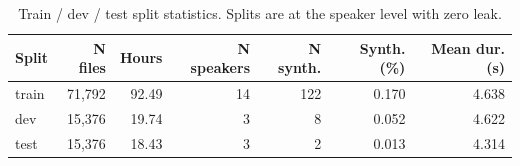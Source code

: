 \begin{table}[!t]
  \centering
  \caption{Train / dev / test split statistics. Splits are at the speaker level with zero leak.}
  \label{tab:per_split}
  \small
  \begin{tabular}{lrrrrrr}
  \toprule
  Split & N files & Hours & N speakers & N synth. & Synth. (\%) & Mean dur. (s) \\
  \midrule
  train & 71,792 & 92.49 & 14 & 122 & 0.170 & 4.638 \\
  dev & 15,376 & 19.74 & 3 & 8 & 0.052 & 4.622 \\
  test & 15,376 & 18.43 & 3 & 2 & 0.013 & 4.314 \\
  \bottomrule
  \end{tabular}
\end{table}
